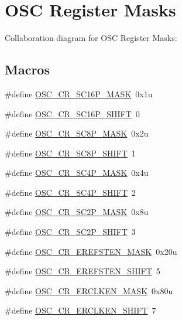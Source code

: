 \hypertarget{group___o_s_c___register___masks}{}\section{O\+SC Register Masks}
\label{group___o_s_c___register___masks}
Collaboration diagram for O\+SC Register Masks\+:
\subsection*{Macros}
\begin{DoxyCompactItemize}
\item 
\#define \hyperlink{group___o_s_c___register___masks_ga8c73f0e22875a434f8031986a9e5f8b4}{O\+S\+C\+\_\+\+C\+R\+\_\+\+S\+C16\+P\+\_\+\+M\+A\+SK}~0x1u
\item 
\#define \hyperlink{group___o_s_c___register___masks_ga4bcf6535cd7e7c4ff935f6b544ca3f9a}{O\+S\+C\+\_\+\+C\+R\+\_\+\+S\+C16\+P\+\_\+\+S\+H\+I\+FT}~0
\item 
\#define \hyperlink{group___o_s_c___register___masks_ga1a5a0db08efaf66c34caf98136cbec11}{O\+S\+C\+\_\+\+C\+R\+\_\+\+S\+C8\+P\+\_\+\+M\+A\+SK}~0x2u
\item 
\#define \hyperlink{group___o_s_c___register___masks_ga6f17376a1571a200e55cac51d1358503}{O\+S\+C\+\_\+\+C\+R\+\_\+\+S\+C8\+P\+\_\+\+S\+H\+I\+FT}~1
\item 
\#define \hyperlink{group___o_s_c___register___masks_ga18f4104a5a6c0d94f0592ee06732fe03}{O\+S\+C\+\_\+\+C\+R\+\_\+\+S\+C4\+P\+\_\+\+M\+A\+SK}~0x4u
\item 
\#define \hyperlink{group___o_s_c___register___masks_gab1724a5b1e96efb22e48a9478ae8cf25}{O\+S\+C\+\_\+\+C\+R\+\_\+\+S\+C4\+P\+\_\+\+S\+H\+I\+FT}~2
\item 
\#define \hyperlink{group___o_s_c___register___masks_ga94a8b0e48d18793bde1a3aaaea44b92c}{O\+S\+C\+\_\+\+C\+R\+\_\+\+S\+C2\+P\+\_\+\+M\+A\+SK}~0x8u
\item 
\#define \hyperlink{group___o_s_c___register___masks_ga0ec9adaf1ca3ec309f1a2c2fd37d3f4d}{O\+S\+C\+\_\+\+C\+R\+\_\+\+S\+C2\+P\+\_\+\+S\+H\+I\+FT}~3
\item 
\#define \hyperlink{group___o_s_c___register___masks_ga3024913f44011d333c6f48ddb00fbf9d}{O\+S\+C\+\_\+\+C\+R\+\_\+\+E\+R\+E\+F\+S\+T\+E\+N\+\_\+\+M\+A\+SK}~0x20u
\item 
\#define \hyperlink{group___o_s_c___register___masks_gac1b9c5d7f156f1792255204dae816aba}{O\+S\+C\+\_\+\+C\+R\+\_\+\+E\+R\+E\+F\+S\+T\+E\+N\+\_\+\+S\+H\+I\+FT}~5
\item 
\#define \hyperlink{group___o_s_c___register___masks_gab96140627de270278cbdfc81fbef63fc}{O\+S\+C\+\_\+\+C\+R\+\_\+\+E\+R\+C\+L\+K\+E\+N\+\_\+\+M\+A\+SK}~0x80u
\item 
\#define \hyperlink{group___o_s_c___register___masks_ga56f4aa6f215268327accda5434671187}{O\+S\+C\+\_\+\+C\+R\+\_\+\+E\+R\+C\+L\+K\+E\+N\+\_\+\+S\+H\+I\+FT}~7
\end{DoxyCompactItemize}


